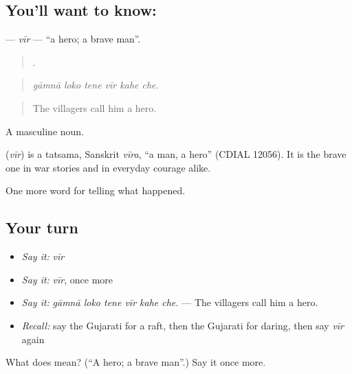 \subsection*{You'll want to know: }
\textbf{} — \emph{vīr} — \textquotedblleft{}a hero; a brave man\textquotedblright{}.

\begin{quote}
     .
\end{quote}

\begin{quote}
\emph{gāmnā loko tene vīr kahe che.}
\end{quote}

\begin{quote}
The villagers call him a hero.
\end{quote}

A masculine noun.

\begin{cousinweb}
\textbf{} (\emph{vīr}) is a tatsama, Sanskrit \emph{vīra}, \textquotedblleft{}a man, a hero\textquotedblright{} (CDIAL 12056). It is the brave one in war stories and in everyday courage alike.
\end{cousinweb}

\begin{grammarlens}[title={What you've built}]
One more word for telling what happened.
\end{grammarlens}

\subsection*{Your turn}
\begin{itemize}
\raggedright
  \item \emph{Say it:} \emph{vīr}
  \item \emph{Say it:} \emph{vīr}, once more
  \item \emph{Say it:} \emph{gāmnā loko tene vīr kahe che.} — The villagers call him a hero.
  \item \emph{Recall:} say the Gujarati for a raft, then the Gujarati for daring, then say \emph{vīr} again
\end{itemize}

\begin{tcolorbox}[breakable,colback=teal!4,colframe=teal!35!black,title={Before you move on}]
What does  mean? (\textquotedblleft{}A hero; a brave man\textquotedblright{}.) Say it once more.
\end{tcolorbox}
